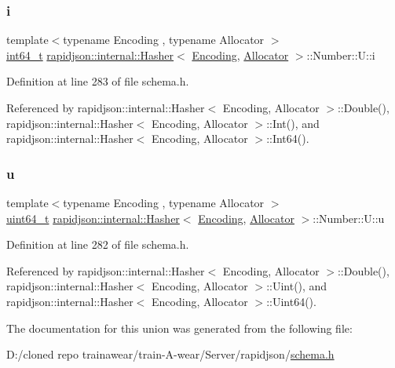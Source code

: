 \subsubsection{\texorpdfstring{i}{i}}
{\footnotesize\ttfamily template$<$typename Encoding , typename Allocator $>$ \\
\mbox{\hyperlink{stdint_8h_a414156feea104f8f75b4ed9e3121b2f6}{int64\+\_\+t}} \mbox{\hyperlink{classrapidjson_1_1internal_1_1_hasher}{rapidjson\+::internal\+::\+Hasher}}$<$ \mbox{\hyperlink{classrapidjson_1_1_encoding}{Encoding}}, \mbox{\hyperlink{classrapidjson_1_1_allocator}{Allocator}} $>$\+::Number\+::\+U\+::i}



Definition at line 283 of file schema.\+h.



Referenced by rapidjson\+::internal\+::\+Hasher$<$ Encoding, Allocator $>$\+::\+Double(), rapidjson\+::internal\+::\+Hasher$<$ Encoding, Allocator $>$\+::\+Int(), and rapidjson\+::internal\+::\+Hasher$<$ Encoding, Allocator $>$\+::\+Int64().

\mbox{\label{unionrapidjson_1_1internal_1_1_hasher_1_1_number_1_1_u_a6e2323cf5b8d8c269c7124e65326867e}} 
\subsubsection{\texorpdfstring{u}{u}}
{\footnotesize\ttfamily template$<$typename Encoding , typename Allocator $>$ \\
\mbox{\hyperlink{stdint_8h_aec6fcb673ff035718c238c8c9d544c47}{uint64\+\_\+t}} \mbox{\hyperlink{classrapidjson_1_1internal_1_1_hasher}{rapidjson\+::internal\+::\+Hasher}}$<$ \mbox{\hyperlink{classrapidjson_1_1_encoding}{Encoding}}, \mbox{\hyperlink{classrapidjson_1_1_allocator}{Allocator}} $>$\+::Number\+::\+U\+::u}



Definition at line 282 of file schema.\+h.



Referenced by rapidjson\+::internal\+::\+Hasher$<$ Encoding, Allocator $>$\+::\+Double(), rapidjson\+::internal\+::\+Hasher$<$ Encoding, Allocator $>$\+::\+Uint(), and rapidjson\+::internal\+::\+Hasher$<$ Encoding, Allocator $>$\+::\+Uint64().



The documentation for this union was generated from the following file\+:\begin{DoxyCompactItemize}
\item 
D\+:/cloned repo trainawear/train-\/\+A-\/wear/\+Server/rapidjson/\mbox{\hyperlink{schema_8h}{schema.\+h}}\end{DoxyCompactItemize}
